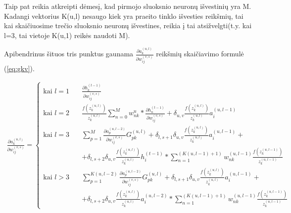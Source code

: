   Taip pat reikia atkreipti dėmesį, kad pirmojo sluoksnio neuronų išvestinių yra M. Kadangi vektorius K(u,l) nesaugo kiek yra praeito tinklo išvesties reikšmių, tai kai skaičiuosime trečio sluoksnio neuronų išvestines, reikia į tai atsižvelgti(t.y. kai l=3, tai vietoje K(u,1) reikės naudoti M).


Apibendrinus šituos tris punktus gaunama $\frac{\partial a_k^{(u,l)}}{\partial w_{ij}^{(v,s)}}$ reikšmių skaičiavimo formulė (\ref{eq:gkv}).


\begin{equation} \label{eq:gkv}
  \begin{aligned}
    \frac{\partial a_k^{(u,l)}}{\partial w_{ij}^{(v,s)}} = \left \{
    \begin{aligned}
      \text{kai } l=1 \quad& \frac{\partial h_k^{(t-1)}}{\partial w_{ij}^{(v,s)}}\\
      \text{kai } l=2 \quad& \frac{f(z_k^{(u,l)})}{z_k^{(u,l)}}
        \sum_{n=0}^M w_{nk}^u * \frac{\partial h_n^{(t-1)}}{\partial w_{ij}^{(v,s)}} +
        \delta_{u,v}\frac{f(z_k^{(u,l)})}{z_k^{(u,l)}}a_i^{(u,l-1)}\\
      \text{kai } l=3 \quad& \sum_{p=1}^{M}
        \frac{\partial a_p^{(u,l-2)}}{\partial w_{ij}^{(v,s)}}G_{pk}^{(u,l)} +
        \delta_{l,s+1}\delta_{u,v}\frac{f(z_k^{(u,l)})}{z_k^{(u,l)}}a_i^{(u,l-1)} + \\
        & + \delta_{l,s+2}\delta_{u,v}\frac{f(z_k^{(u,l)})}{z_k^{(u,l)}}h_i^{(t-1)}*\sum_{n=1}^{(K(u,l-1)+1)}
        w_{nk}^{(u,l-1)}\frac{f(z_k^{(u,l-1)})}{z_k^{(u,l-1)}}\\
      \text{kai } l>3 \quad& \sum_{p=1}^{K(u,l-2)}
        \frac{\partial a_p^{(u,l-2)}}{\partial w_{ij}^{(v,s)}}G_{pk}^{(u,l)} +
        \delta_{l,s+1}\delta_{u,v}\frac{f(z_k^{(u,l)})}{z_k^{(u,l)}}a_i^{(u,l-1)} + \\
        & + \delta_{l,s+2}\delta_{u,v}\frac{f(z_k^{(u,l)})}{z_k^{(u,l)}}a_i^{(u,l-2)}*\sum_{n=1}^{(K(u,l-1)+1)}
        w_{nk}^{(u,l-1)}\frac{f(z_k^{(u,l-1)})}{z_k^{(u,l-1)}}
    \end{aligned}
    \right.
  \end{aligned}
\end{equation}




